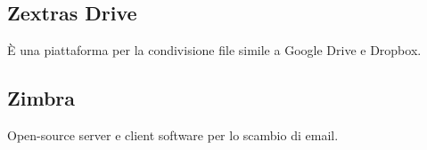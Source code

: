 \subsection{Zextras Drive} È una piattaforma per la condivisione file simile a Google Drive e Dropbox.
\subsection{Zimbra} Open-source server e client software per lo scambio di email.
